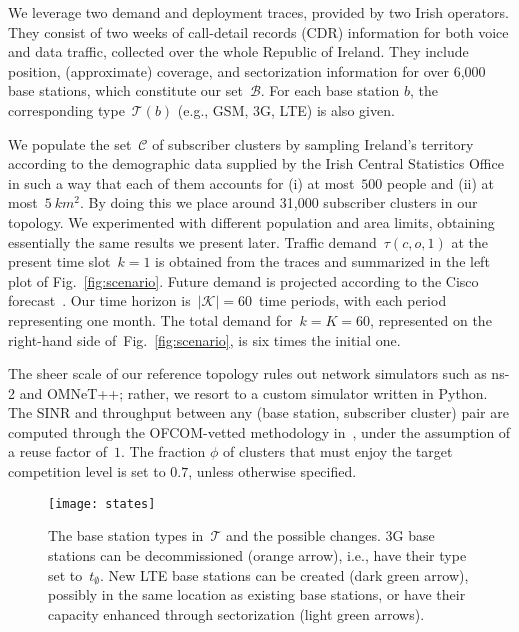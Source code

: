 \documentclass[10pt,journal,cspaper,compsoc]{IEEEtran}
\newcommand{\Fig}[1]{Fig.~\ref{fig:#1}}
\newcommand{\Bc}{\mathcal{B}}
\newcommand{\Cc}{\mathcal{C}}
\newcommand{\Kc}{\mathcal{K}}
\newcommand{\Tc}{\mathcal{T}}
\begin{document}
We leverage two demand and deployment traces, provided by two Irish operators. They consist of two weeks of call-detail records (CDR) information for both voice and data traffic, collected over the whole Republic of Ireland. They include position, (approximate) coverage, and sectorization information for over 6,000 base stations, which constitute our set~$\Bc$. For each base station $b$, the corresponding type~$\Tc(b)$ (e.g., GSM, 3G, LTE) is also given.

We populate the set~$\Cc$ of subscriber clusters by sampling Ireland's territory
according to the demographic data supplied by the Irish Central Statistics
Office~\cite{census2011} in such a way that each of 
them accounts for (i) at most~$500$ people and (ii) at most~$5~km^2$. By doing this we place around
31,000 subscriber clusters in our topology.
We experimented with different population and area limits, obtaining essentially the same
results we present later.
Traffic demand~$\tau(c,o,1)$ at the present time slot~$k=1$ is obtained
from the traces and summarized in the left plot of \Fig{scenario}.
Future demand is projected according to the Cisco forecast~\cite{cisco}. Our time horizon is~$|\Kc|=60$~time 
periods, with each period representing one month. The total demand for~$k=K=60$, represented on the right-hand 
side of~\Fig{scenario}, is six times the initial one.

The sheer scale of our reference topology rules out network simulators such as ns-2 and OMNeT++; rather, we resort to a custom simulator written in Python.
The SINR and throughput between any (base station, subscriber cluster) pair are computed through the OFCOM-vetted
methodology in~\cite{annex-14}, under the assumption of a reuse factor of~$1$.
The fraction $\phi$ of clusters that must enjoy the target competition level is set to $0.7$, unless
otherwise specified.

\begin{figure}
\centering
\texttt{[image: states]}
\caption{
The base station types in~$\Tc$ and the possible changes. 3G base stations can be decommissioned
(orange arrow), i.e., have their type set to~$t_\emptyset$. New LTE base stations can be
created (dark green arrow), possibly in the same location as existing base stations,
or have their capacity enhanced through sectorization (light green arrows).
\label{fig:states}
}
\end{figure}
\end{document}
